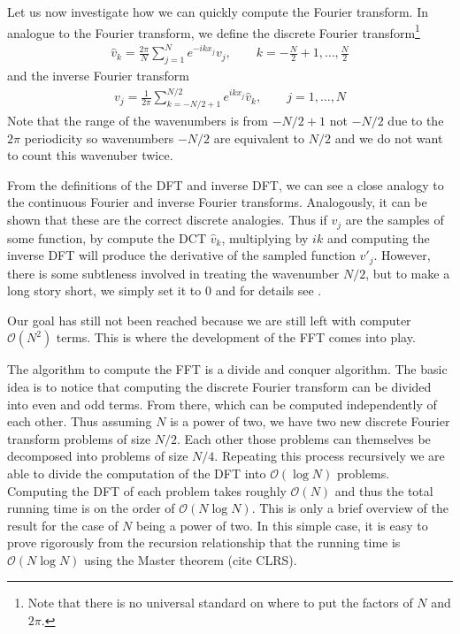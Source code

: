 Let us now investigate how we can quickly compute the Fourier transform. In analogue to the Fourier transform, we define the discrete Fourier transform\footnote{Note that there is no universal standard on where to put the factors of $N$ and $2\pi$.}
\begin{align}
\hat{v}_{k} = \frac{2\pi}{N}\sum_{j=1}^{N} e^{-ikx_{j}}v_{j},\qquad k=-\frac{N}{2}+1,\ldots,\frac{N}{2}
\end{align}
and the inverse Fourier transform 
\begin{align}
v_{j} = \frac{1}{2\pi}\sum_{k=-N/2+1}^{N/2} e^{ikx_{j}}\hat{v}_{k}, \qquad j=1,\ldots, N
\end{align}
Note that the range of the wavenumbers is from $-N/2+1$ not $-N/2$ due to the $2\pi$ periodicity so wavenumbers $-N/2$ are equivalent to $N/2$ and we do not want to count this wavenuber twice. 

From the definitions of the DFT and inverse DFT, we can see a close analogy to the continuous Fourier and inverse Fourier transforms. Analogously, it can be shown \cite{trefethen_spectral} that these are the correct discrete analogies. Thus if $v_{j}$ are the samples of some function, by compute the DCT $\hat{v}_{k}$, multiplying by $ik$ and computing the inverse DFT will produce the derivative of the sampled function $v'_{j}$. However, there is some subtleness involved in treating the wavenumber $N/2$, but to make a long story short, we simply set it to $0$ and for details see \cite{trefethen_spectral}.  

Our goal has still not been reached because we are still left with computer $\mathcal{O}(N^{2})$ terms. This is where the development of the FFT comes into play.  

The algorithm to compute the FFT is a divide and conquer algorithm. The basic idea is to notice that computing the discrete Fourier transform can be divided into even and odd terms. From there, which can be computed independently of each other. Thus assuming $N$ is a power of two, we have two new discrete Fourier transform problems of size $N/2$. Each other those problems can themselves be decomposed into problems of size $N/4$. Repeating this process recursively we are able to divide the computation of the DFT into $\mathcal{O}(\log N)$ problems. Computing the DFT of each problem takes roughly $\mathcal{O}(N)$ and thus the total running time is on the order of $\mathcal{O}(N\log N)$. This is only a brief overview of the result for the case of $N$ being a power of two. In this simple case, it is easy to prove rigorously from the recursion relationship that the running time is $\mathcal{O}(N\log N)$ using the Master theorem (cite CLRS). 

